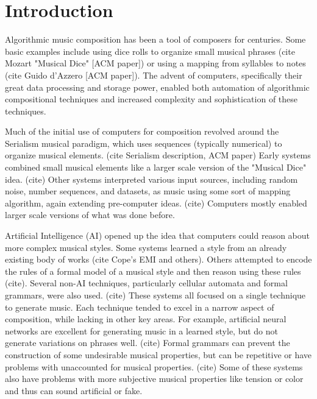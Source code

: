 \section{Introduction}

Algorithmic music composition has been a tool of composers for centuries.
Some basic examples include using dice rolls to organize small musical phrases (cite Mozart "Musical Dice" [ACM paper]) or using a mapping from syllables to notes (cite Guido d'Azzero [ACM paper]).
The advent of computers, specifically their great data processing and storage power, enabled both automation of algorithmic compositional techniques and increased complexity and sophistication of these techniques.

Much of the initial use of computers for composition revolved around the Serialism musical paradigm, which uses sequences (typically numerical) to organize musical elements. (cite Serialism description, ACM paper)
Early systems combined small musical elements like a larger scale version of the "Musical Dice" idea. (cite)
Other systems interpreted various input sources, including random noise, number sequences, and datasets, as music using some sort of mapping algorithm, again extending pre-computer ideas. (cite)
Computers mostly enabled larger scale versions of what was done before.

Artificial Intelligence (AI) opened up the idea that computers could reason about more complex musical styles.
Some systems learned a style from an already existing body of works (cite Cope's EMI and others).
Others attempted to encode the rules of a formal model of a musical style and then reason using these rules (cite).
Several non-AI techniques, particularly cellular automata and formal grammars, were also used. (cite)
These systems all focused on a single technique to generate music.
Each technique tended to excel in a narrow aspect of composition, while lacking in other key areas.
For example, artificial neural networks are excellent for generating music in a learned style, but do not generate variations on phrases well. (cite)
Formal grammars can prevent the construction of some undesirable musical properties, but can be repetitive or have problems with unaccounted for musical properties. (cite)
Some of these systems also have problems with more subjective musical properties like tension or color and thus can sound artificial or fake.

